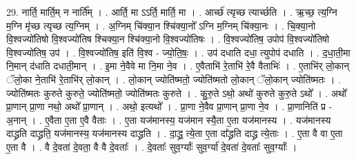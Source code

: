\documentclass[17pt]{extarticle}
\begin{document}
29. नार्ति॒ मार्ति॒म् न नार्ति᳚म् । . आर्ति॒ मा ऽऽर्ति॒ मार्ति॒ मा । . आर्च्छ॑ त्यृच्छ त्यार्च्छति । . ऋ॒च्छ॒ त्य॒ग्नि म॒ग्नि मृ॑च्छ त्यृच्छ त्य॒ग्निम् । . अ॒ग्निम् चि॑क्या॒न श्चि॑क्या॒नो᳚ ऽग्नि म॒ग्निम् चि॑क्या॒नः । . चि॒क्या॒नो वि॒श्वज्यो॑तिषो वि॒श्वज्यो॑तिष श्चिक्या॒न श्चि॑क्या॒नो वि॒श्वज्यो॑तिषः । . वि॒श्वज्यो॑तिष॒ उपोप॑ वि॒श्वज्यो॑तिषो वि॒श्वज्यो॑तिष॒ उप॑ । . वि॒श्वज्यो॑तिष॒ इति॑ वि॒श्व - ज्यो॒ति॒षः॒ । . उप॑ दधाति दधा॒ त्युपोप॑ दधाति । . द॒धा॒ती॒मा नि॒मान् द॑धाति दधाती॒मान् । . इ॒मा ने॒वैवे मा नि॒मा ने॒व । . ए॒वैताभि॑ रे॒ताभि॑ रे॒वै वैताभिः॑ । . ए॒ताभि॑र् लो॒कान् ॅलो॒का ने॒ताभि॑ रे॒ताभि॑र् लो॒कान् । . लो॒कान् ज्योति॑ष्मतो॒ ज्योति॑ष्मतो लो॒कान् ॅलो॒कान् ज्योति॑ष्मतः । . ज्योति॑ष्मतः कुरुते कुरुते॒ ज्योति॑ष्मतो॒ ज्योति॑ष्मतः कुरुते । . कु॒रु॒ते ऽथो॒ अथो॑ कुरुते कुरु॒ते ऽथो᳚ । . अथो᳚ प्रा॒णान् प्रा॒णा नथो॒ अथो᳚ प्रा॒णान् । . अथो॒ इत्यथो᳚ । . प्रा॒णा ने॒वैव प्रा॒णान् प्रा॒णा ने॒व । . प्रा॒णानिति॑ प्र - अ॒नान् । . ए॒वैता ए॒ता ए॒वै वैताः । . ए॒ता यज॑मानस्य॒ यज॑मान स्यै॒ता ए॒ता यज॑मानस्य । . यज॑मानस्य दाद्ध्रति दाद्ध्रति॒ यज॑मानस्य॒ यज॑मानस्य दाद्ध्रति । . दा॒द्ध्र॒ त्ये॒ता ए॒ता दा᳚द्ध्रति दाद्ध्र त्ये॒ताः । . ए॒ता वै वा ए॒ता ए॒ता वै । . वै दे॒वता॑ दे॒वता॒ वै वै दे॒वताः᳚ । . दे॒वताः᳚ सुव॒र्ग्याः᳚ सुव॒र्ग्या॑ दे॒वता॑ दे॒वताः᳚ सुव॒र्ग्याः᳚ । \newline
\end{document}
